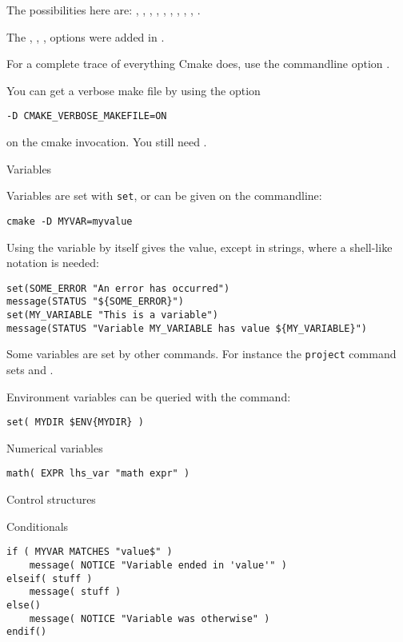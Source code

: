 The possibilities here are: , ,
, , , ,
, , , .

The , , ,  options
were added in .

For a complete trace of everything Cmake does, use
the commandline option .

You can get a verbose make file by using the option
\begin{verbatim}
-D CMAKE_VERBOSE_MAKEFILE=ON
\end{verbatim}
on the cmake invocation. You still need .

 {Variables}

Variables are set with \texttt{set},
or can be given on the commandline:
\begin{lstlisting}
cmake -D MYVAR=myvalue
\end{lstlisting}
Using the variable by itself gives the value,
except in strings, where a shell-like notation is needed:
\begin{lstlisting}
set(SOME_ERROR "An error has occurred")
message(STATUS "${SOME_ERROR}")
set(MY_VARIABLE "This is a variable")
message(STATUS "Variable MY_VARIABLE has value ${MY_VARIABLE}")
\end{lstlisting}

Some variables are set by other commands.
For instance the \texttt{project} command sets
 and .

Environment variables can be queried with the  command:
\begin{lstlisting}
set( MYDIR $ENV{MYDIR} )
\end{lstlisting}

 {Numerical variables}

\begin{lstlisting}
math( EXPR lhs_var "math expr" )
\end{lstlisting}

 {Control structures}

 {Conditionals}

\begin{lstlisting}
if ( MYVAR MATCHES "value$" )
    message( NOTICE "Variable ended in 'value'" )
elseif( stuff )
    message( stuff )
else()
    message( NOTICE "Variable was otherwise" )
endif()
\end{lstlisting}

